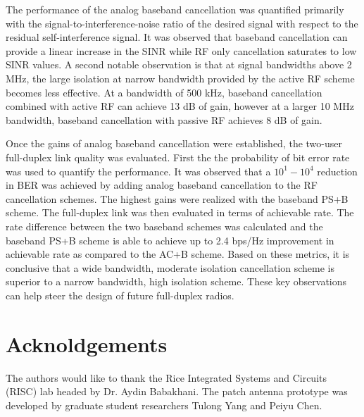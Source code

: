\documentclass[12pt, journal,draftcls,letterpaper,onecolumn]{IEEEtran}
\begin{document}
The performance of the analog baseband cancellation was quantified primarily with the signal-to-interference-noise ratio of the desired signal with respect to the residual self-interference signal.  It was observed that baseband cancellation can provide a linear increase in the SINR while RF only cancellation saturates to low SINR values.  A second notable observation is that at signal bandwidths above 2 MHz, the large isolation at narrow bandwidth provided by the active RF scheme becomes less effective.  At a bandwidth of 500 kHz, baseband cancellation combined with active RF can achieve 13 dB of gain, however at a larger 10 MHz bandwidth, baseband cancellation with passive RF achieves 8 dB of gain.  

Once the gains of analog baseband cancellation were established, the two-user full-duplex link quality was evaluated. First the the probability of bit error rate was used to quantify the performance.  It was observed that a $10^1 - 10^4$ reduction in BER was achieved by adding analog baseband cancellation to the RF cancellation schemes.  The highest gains were realized with the baseband PS+B scheme.  The full-duplex link was then evaluated in terms of achievable rate.  The rate difference between the two baseband schemes was calculated and the baseband PS+B scheme is able to achieve up to 2.4 bps/Hz improvement in achievable rate as compared to the AC+B scheme.  Based on these metrics, it is conclusive that a wide bandwidth, moderate isolation cancellation scheme is superior to a narrow bandwidth, high isolation scheme.  These key observations can help steer the design of future full-duplex radios.  


\section{Acknoldgements}
The authors would like to thank the Rice Integrated Systems and Circuits (RISC) lab headed by Dr. Aydin Babakhani.  The patch antenna prototype was developed by graduate student researchers Tulong  Yang and Peiyu Chen.    




































\ifCLASSOPTIONcaptionsoff
  \newpage
\fi









 
   
\end{document}
